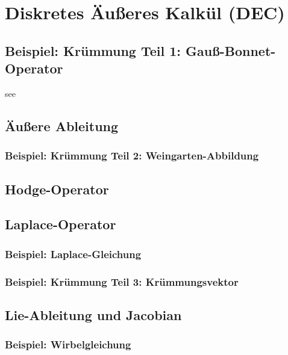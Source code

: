 \chapter{Diskretes Äußeres Kalkül (DEC)}
\label{chapterDEC}

\section{Beispiel: Krümmung Teil 1: Gauß-Bonnet-Operator}
see \cite{Lee} \cite{FirstCourse}

\section{Äußere Ableitung}
  
  \subsection{Beispiel: Krümmung Teil 2: Weingarten-Abbildung}

\section{Hodge-Operator}

\section{Laplace-Operator}

  \subsection{Beispiel: Laplace-Gleichung}

  \subsection{Beispiel: Krümmung Teil 3: Krümmungsvektor}


\section{Lie-Ableitung und Jacobian}

  \subsection{Beispiel: Wirbelgleichung}


